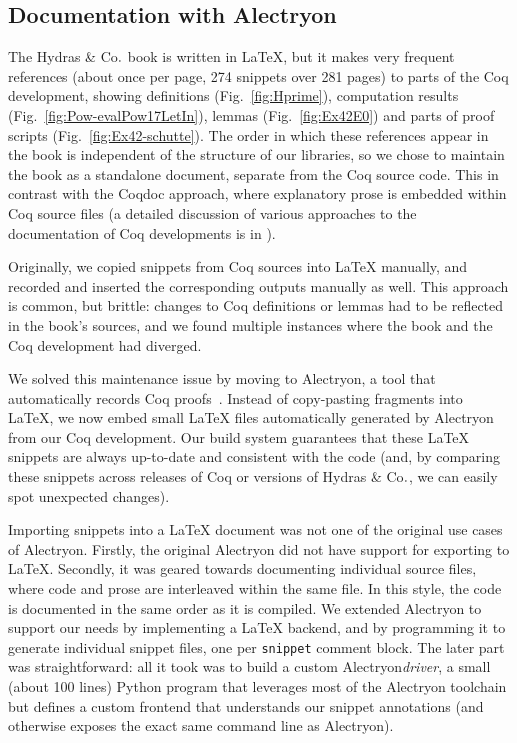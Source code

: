 \documentclass{easychair}
\newcommand{\coq}{Coq\xspace}
\newcommand{\alectr}{Alectryon\xspace}
\newcommand{\Hydras}{Hydras \& Co$\text.$\xspace}
\begin{document}
\subsection{Documentation with \alectr}

The \Hydras book is written in LaTeX, but it makes very frequent references (about once per page, 274 snippets over 281 pages) to parts of the \coq development, showing definitions (Fig.~\ref{fig:Hprime}), computation results (Fig.~\ref{fig:Pow-evalPow17LetIn}), lemmas (Fig.~\ref{fig:Ex42E0}) and parts of  proof scripts (Fig.~\ref{fig:Ex42-schutte}). The order in which these references appear in the book is independent of the structure of our libraries, so we chose to maintain the book as a standalone document, separate from the \coq source code.  This in contrast with the Coqdoc approach, where explanatory prose is embedded within \coq source files (a detailed discussion of various approaches to the documentation of \coq developments is in \cite{alectryonpaper}).

Originally, we copied snippets from \coq sources into LaTeX manually, and recorded and inserted the corresponding outputs manually as well.  This approach is common, but brittle: changes to \coq definitions or lemmas had to be reflected in the book's sources, and we found multiple instances where the book and the \coq development had diverged.
 
We solved this maintenance issue by moving to \alectr, a tool that automatically records \coq proofs~\cite{alectryongithub}.  Instead of copy-pasting fragments into LaTeX, we now embed small LaTeX files automatically generated by \alectr from our \coq development.  Our build system guarantees that these LaTeX snippets are always up-to-date and consistent with the code (and, by comparing these snippets across releases of \coq or versions of \Hydras, we can easily spot unexpected changes).

Importing snippets into a LaTeX document was not one of the original use cases of Alectryon. Firstly, the original Alectryon did not have support for exporting to LaTeX. Secondly, it was geared towards documenting individual source files, where code and prose are interleaved within the same file. In this style, the code is documented in the same order as it is compiled.
We extended \alectr to support our needs by implementing a LaTeX backend, and by programming it to generate individual snippet files, one per \texttt{snippet} comment block.  The later part was straightforward: all it took was to build a custom \alectr \textit{driver}, a small (about 100 lines) Python program that leverages most of the \alectr toolchain but defines a custom frontend that understands our snippet annotations (and otherwise exposes the exact same command line as \alectr).
\end{document}
